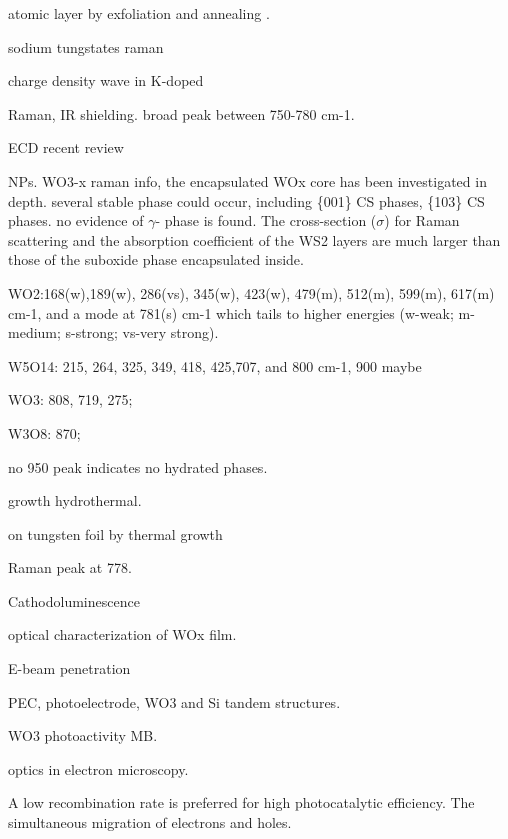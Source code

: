  atomic layer by exfoliation and annealing . \cite{Kalantar-zadeh2010a}

sodium tungstates raman \cite{Redkin2010}

  charge density wave in K-doped  \cite{Raj2008}

   Raman, IR shielding.\cite{Guo2012} \cite{Guo2011}
broad peak between 750-780 cm-1.


  ECD \cite{Jiao2012} recent review \cite{Mortimer2011}

   NPs. \cite{Frey2001}
WO3-x raman info, the encapsulated WOx core has been investigated in depth. several stable phase could occur, including \{001\} CS phases, \{103\} CS phases. no evidence of $\gamma$- phase is found. The cross-section ($\sigma$) for Raman scattering and the absorption coefficient of the WS2 layers are much larger than those of the suboxide phase encapsulated inside.

WO2:168(w),189(w), 286(vs), 345(w), 423(w), 479(m), 512(m), 599(m),
617(m) cm-1, and a mode at 781(s) cm-1 which tails to higher energies (w-weak; m-medium; s-strong; vs-very strong).

W5O14: 215, 264, 325, 349, 418, 425,707, and 800 cm-1, 900 maybe

WO3: 808, 719, 275;

W3O8: 870;

no 950 peak indicates no hydrated phases.


   growth hydrothermal.\cite{Moshofsky2012}

   on tungsten foil by thermal growth\cite{VanHieu2012}

   Raman peak at 778. \cite{Deb2007}

  Cathodoluminescence \cite{Parish2007}

  optical characterization of WOx film.\cite{Valyukh2010a}

  E-beam penetration \cite{Kanaya2002}

  PEC, photoelectrode, WO3 and Si tandem structures.\cite{Coridan2013}

  WO3 photoactivity MB. \cite{Watcharenwong2008}

  optics in electron microscopy. \cite{GarciadeAbajo2010a}

  A low recombination rate is preferred for high photocatalytic efficiency. The simultaneous migration of electrons and holes.



